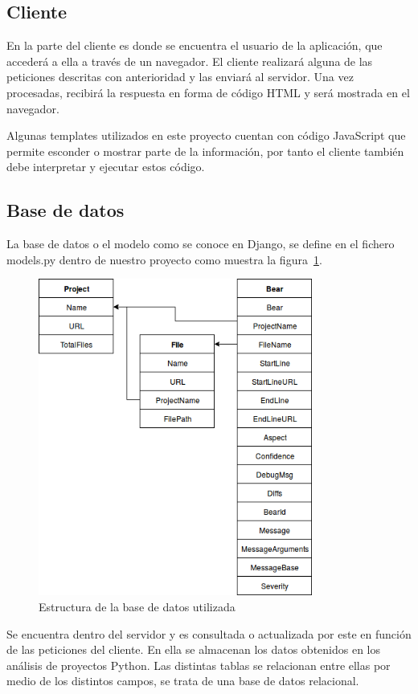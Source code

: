 \documentclass[a4paper, 12pt]{book}
\begin{document}
\subsection{Cliente}
\label{sec:seccion11.2}
En la parte del cliente es donde se encuentra el usuario de la aplicación, que accederá a ella a través de un navegador. El cliente realizará alguna de las peticiones descritas con anterioridad y las enviará al servidor. Una vez procesadas, recibirá la respuesta en forma de código HTML y será mostrada en el navegador.

Algunas templates utilizados en este proyecto cuentan con código JavaScript que permite esconder o mostrar parte de la información, por tanto el cliente también debe interpretar y ejecutar estos código.

\subsection{Base de datos}
\label{sec:seccion11.3}
La base de datos o el modelo como se conoce en Django, se define en el fichero models.py dentro de nuestro proyecto como muestra la figura~\ref{fig:EstructuraBBDD}.
\begin{figure}[h]
  \centering
  \includegraphics[width=9cm, keepaspectratio]{img/EstructuraBBDD}
  \caption{Estructura de la base de datos utilizada}
  \label{fig:EstructuraBBDD}
\end{figure}
Se encuentra dentro del servidor y es consultada o actualizada por este en función de las peticiones del cliente. En ella se almacenan los datos obtenidos en los análisis de proyectos Python. Las distintas tablas se relacionan entre ellas por medio de los distintos campos, se trata de una base de datos relacional.
\end{document}
